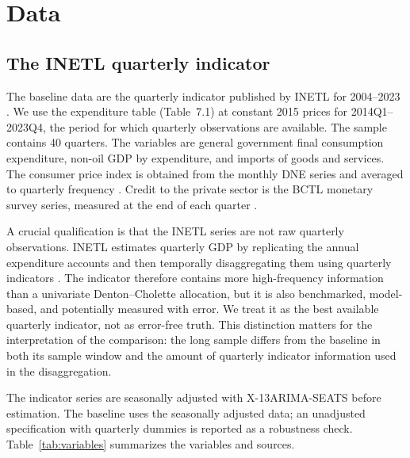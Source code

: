 \documentclass[11pt,a4paper]{article}
\begin{document}
\section{Data}
\label{sec:data}

\subsection{The INETL quarterly indicator}
\label{sec:official}

The baseline data are the quarterly indicator published by INETL for 2004--2023 \parencite{inetl2023}. We use the expenditure table (Table~7.1) at constant 2015 prices for 2014Q1--2023Q4, the period for which quarterly observations are available. The sample contains 40 quarters. The variables are general government final consumption expenditure, non-oil GDP by expenditure, and imports of goods and services. The consumer price index is obtained from the monthly DNE series and averaged to quarterly frequency \parencite{dne_cpi}. Credit to the private sector is the BCTL monetary survey series, measured at the end of each quarter \parencite{bctl2024}.

A crucial qualification is that the INETL series are not raw quarterly observations. INETL estimates quarterly GDP by replicating the annual expenditure accounts and then temporally disaggregating them using quarterly indicators \parencite{inetl2023}. The indicator therefore contains more high-frequency information than a univariate Denton--Cholette allocation, but it is also benchmarked, model-based, and potentially measured with error. We treat it as the best available quarterly indicator, not as error-free truth. This distinction matters for the interpretation of the comparison: the long sample differs from the baseline in both its sample window and the amount of quarterly indicator information used in the disaggregation.

The indicator series are seasonally adjusted with X-13ARIMA-SEATS before estimation. The baseline uses the seasonally adjusted data; an unadjusted specification with quarterly dummies is reported as a robustness check. Table~\ref{tab:variables} summarizes the variables and sources.
\end{document}
